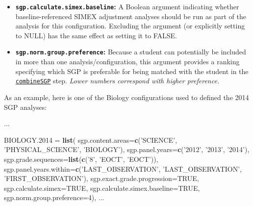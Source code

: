 \documentclass[12pt]{article}
\newenvironment{Shaded}{\begin{snugshade}}{\end{snugshade}}
\newcommand{\KeywordTok}[1]{\textcolor[rgb]{0.13,0.29,0.53}{\textbf{{#1}}}}
\newcommand{\DataTypeTok}[1]{\textcolor[rgb]{0.13,0.29,0.53}{{#1}}}
\newcommand{\DecValTok}[1]{\textcolor[rgb]{0.00,0.00,0.81}{{#1}}}
\newcommand{\FloatTok}[1]{\textcolor[rgb]{0.00,0.00,0.81}{{#1}}}
\newcommand{\StringTok}[1]{\textcolor[rgb]{0.31,0.60,0.02}{{#1}}}
\newcommand{\OtherTok}[1]{\textcolor[rgb]{0.56,0.35,0.01}{{#1}}}
\newcommand{\NormalTok}[1]{{#1}}
\begin{document}
\begin{itemize}
  whether cohort-referenced SIMEX adjustment analyses should be run as
  part of the analysis for this configuration. Excluding the argument
  (or explicitly setting to NULL) has the same effect as setting it to
  FALSE.
\item
  \textbf{\texttt{sgp.calculate.simex.baseline}:} A Boolean argument
  indicating whether baseline-referenced SIMEX adjustment analyses
  should be run as part of the analysis for this configuration.
  Excluding the argument (or explicitly setting to NULL) has the same
  effect as setting it to FALSE.
\item
  \textbf{\texttt{sgp.norm.group.preference}:} Because a student can
  potentially be included in more than one analysis/configuration, this
  argument provides a ranking specifying which SGP is preferable for
  being matched with the student in the
  \href{https://github.com/CenterForAssessment/SGP/blob/master/R/combineSGP.R}{\texttt{combineSGP}}
  step. \emph{Lower numbers correspond with higher preference.}
\end{itemize}

As an example, here is one of the Biology configurations used to defined
the 2014 SGP analyses:

\begin{Shaded}
\begin{Highlighting}[]
\NormalTok{...}

  \NormalTok{BIOLOGY}\FloatTok{.2014} \NormalTok{=}\StringTok{ }\KeywordTok{list}\NormalTok{(}
        \DataTypeTok{sgp.content.areas=}\KeywordTok{c}\NormalTok{(}\StringTok{'SCIENCE'}\NormalTok{, }\StringTok{'PHYSICAL_SCIENCE'}\NormalTok{, }\StringTok{'BIOLOGY'}\NormalTok{),}
        \DataTypeTok{sgp.panel.years=}\KeywordTok{c}\NormalTok{(}\StringTok{'2012'}\NormalTok{, }\StringTok{'2013'}\NormalTok{, }\StringTok{'2014'}\NormalTok{),}
        \DataTypeTok{sgp.grade.sequences=}\KeywordTok{list}\NormalTok{(}\KeywordTok{c}\NormalTok{(}\StringTok{'8'}\NormalTok{, }\StringTok{'EOCT'}\NormalTok{, }\StringTok{'EOCT'}\NormalTok{)),}
        \DataTypeTok{sgp.panel.years.within=}\KeywordTok{c}\NormalTok{(}\StringTok{'LAST_OBSERVATION'}\NormalTok{, }\StringTok{'LAST_OBSERVATION'}\NormalTok{, }\StringTok{'FIRST_OBSERVATION'}\NormalTok{),}
        \DataTypeTok{sgp.exact.grade.progression=}\OtherTok{TRUE}\NormalTok{,}
        \DataTypeTok{sgp.calculate.simex=}\OtherTok{TRUE}\NormalTok{,}
        \DataTypeTok{sgp.calculate.simex.baseline=}\OtherTok{TRUE}\NormalTok{,}
        \DataTypeTok{sgp.norm.group.preference=}\DecValTok{4}\NormalTok{), }
\NormalTok{...}
\end{Highlighting}
\end{Shaded}
\end{document}
